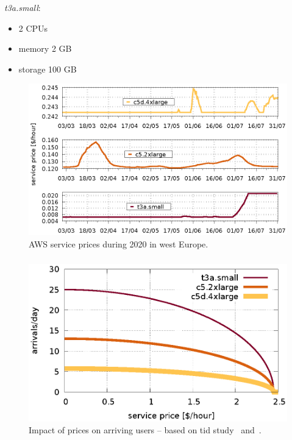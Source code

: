 \documentclass[aspectratio=169]{beamer}
\begin{document}
\begin{frame}
    \frametitle{\secname}
    \framesubtitle{\subsecname}
    \begin{minipage}{0.3\textwidth}
        \textit{t3a.small}:
        \begin{itemize}
            \item 2 CPUs
            \item memory 2 GB
            \item storage 100 GB
        \end{itemize}
    \end{minipage}
    \begin{minipage}{0.65\textwidth}
        \begin{figure}
            \centering
            \includegraphics[width=\textwidth]{img/experiment-aws-prices}
            \caption{AWS service prices during 2020 in west Europe.}
            \label{fig:aws-prices}
        \end{figure}
    \end{minipage}
\end{frame}


\begin{frame}
    \frametitle{\secname}
    \framesubtitle{\subsecname}

    \begin{figure}
        \centering
        \includegraphics[width=.65\textwidth]{img/rho-arrivals}
        \caption{Impact of prices on arriving users -- based on tid study~\cite{tid} and~\cite{xavierPricing}.}
        \label{fig:arrivals}
    \end{figure}
\end{frame}
\end{document}
